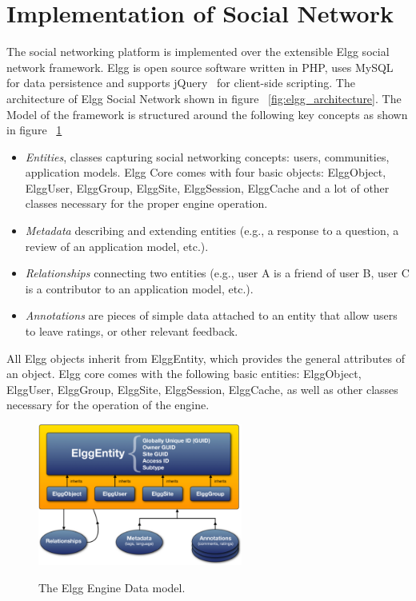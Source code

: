 \section{Implementation of Social Network}
\label{sec:implementaion_of_social_netowrk}
The social networking platform is implemented over the extensible Elgg social network framework\cite{elgg_url}.  Elgg is open source software written in PHP, uses MySQL for data persistence and supports jQuery~\cite{jquery_url} for client-side scripting.  The architecture of Elgg Social Network shown in figure ~\ref{fig:elgg_architecture}. The Model of the framework is structured around the following key concepts as shown in figure ~\ref{fig:elgg_entities}
\begin{itemize}
\item \emph{Entities}, classes capturing social networking concepts: users, communities, application models. Elgg Core comes with four basic objects: ElggObject, ElggUser, ElggGroup, ElggSite, ElggSession, ElggCache and a lot of other classes necessary for the proper engine operation.
\item \emph{Metadata} describing and extending entities (e.g., a response to a question, a review of an application model, etc.).
\item  \emph{Relationships} connecting two entities (e.g., user A is a friend of user B, user C is a contributor to an application model, etc.).
\item \emph{Annotations} are pieces of simple data attached to an entity that allow users to leave ratings, or other relevant feedback.
\end{itemize}
All Elgg objects inherit from ElggEntity, which provides the general attributes of an object. Elgg core comes with the following basic entities: ElggObject, ElggUser, ElggGroup, ElggSite, ElggSession, ElggCache, as well as other classes necessary for the operation of the engine.

\begin{figure}[h]
	\caption{The Elgg Engine Data model.}
	\includegraphics[width=0.6\textwidth,natwidth=200,natheight=150]{./fig/elgg_data_model.png}
	\centering
	\label{fig:elgg_entities}
\end{figure}


